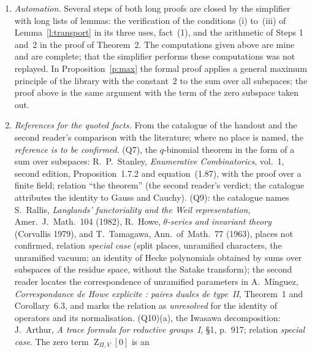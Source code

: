 \documentclass[11pt,a4paper]{article}
\newcommand{\m}[1]{\mbox{$#1$}}        %
\theoremstyle{plainx}
\theoremstyle{uprightx}
\newcommand{\ZT}[3]{\operatorname{Z}_{#1,#2}[#3]}
\begin{document}
\begin{enumerate}[label=\textup{\arabic*.},leftmargin=1.6em,itemsep=5pt]
which~$\Psi$ does not vanish, the coefficient of the indicator at~$z'$ is~$\Psi(z')$, and the identity of fact~(3)
makes every term equal to \m{\Psi(z)C_{z}(\Xi)}; the set is not empty because \m{\Psi\ne0}. This is the second
reader's correction, which the dossier now follows, and it is what I find in lines 129 to~139. The matrix to which Lemma~\ref{l:annihilator} is applied in Step~2 has the lower
block \m{\mathfrak{t}_{w}1_{r}}; its left inverse does not depend on the upper block.
\item \emph{Automation.} Several steps of both long proofs are closed by the simplifier with long lists of
lemmas: the verification of the conditions (i) to~(iii) of Lemma~\ref{l:transport} in its three uses, fact~(1), and
the arithmetic of Steps 1 and~2 in the proof of Theorem~2. The computations given above are mine and are
complete; that the simplifier performs these computations was not replayed. In Proposition~\ref{p:max} the formal
proof applies a general maximum principle of the library with the constant~$2$ to the sum over all subspaces;
the proof above is the same argument with the term of the zero subspace taken out.
\item \emph{References for the quoted facts.} From the catalogue of the handout and the second reader's
comparison with the literature; where no place is named, the \emph{reference is to be confirmed}. (Q7), the
$q$-binomial theorem in the form of a sum over subspaces: R.~P.~Stanley, \emph{Enumerative Combinatorics},
vol.~1, second edition, Proposition~1.7.2 and equation~(1.87), with the proof over a finite field; relation ``the
theorem'' (the second reader's verdict; the catalogue attributes the identity to Gauss and Cauchy). (Q9): the catalogue names S.~Rallis, \emph{Langlands'
functoriality and the Weil representation}, Amer.~J.~Math.~104 (1982), R.~Howe, \emph{$\theta$-series and
invariant theory} (Corvallis 1979), and T.~Tamagawa, Ann.~of~Math.~77 (1963), places not confirmed, relation
\emph{special case} (split places, unramified characters, the unramified vacuum; an identity of Hecke
polynomials obtained by sums over subspaces of the residue space, without the Satake transform); the second
reader locates the correspondence of unramified parameters in A.~Mínguez, \emph{Correspondance de Howe
explicite : paires duales de type~II}, Theorem~1 and Corollary~6.3, and marks the relation as \emph{unresolved}
for the identity of operators and its normalisation. (Q10)(a), the Iwasawa decomposition: J.~Arthur, \emph{A trace
formula for reductive groups~I}, §1, p.~917; relation \emph{special case}. The zero term \m{\ZT{\Pi}{V}{0}} is an

\end{enumerate}
\end{document}
